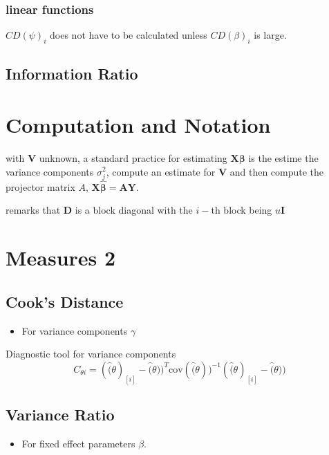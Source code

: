 \documentclass[12pt, a4paper]{report}
\theoremstyle{plain}
\theoremstyle{definition}
\theoremstyle{remark}
\begin{document}
\subsubsection{linear functions}


$CD(\psi)_i$ does not have to be calculated unless $CD(\beta)_i$ is large.




\subsection{Information Ratio}




\newpage
\section{Computation and Notation } %
with $\boldsymbol{V}$ unknown, a standard practice for estimating $\boldsymbol{X \beta}$ is the estime the variance components $\sigma^2_j$,
compute an estimate for $\boldsymbol{V}$ and then compute the projector matrix $A$, $\boldsymbol{X \hat{\beta}}  = \boldsymbol{AY}$.




\citet{zewotir} remarks that $\boldsymbol{D}$ is a block diagonal with the $i-$th block being $u \boldsymbol{I}$
\newpage
\section{Measures 2} %


\subsection{Cook's Distance} %
\begin{itemize}
\item For variance components $\gamma$
\end{itemize}


Diagnostic tool for variance components
\[ C_{\theta i} =(\hat(\theta)_{[i]} - \hat(\theta))^{T}\mbox{cov}( \hat(\theta))^{-1}(\hat(\theta)_{[i]} - \hat(\theta))\]


\subsection{Variance Ratio} %
\begin{itemize}
\item For fixed effect parameters $\beta$.
\end{itemize}
\end{document}
